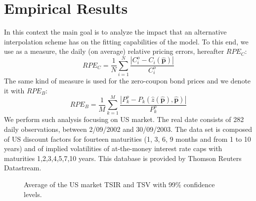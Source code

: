 \section{Empirical Results}
%
In this context the main goal is to analyze the impact that an 
alternative interpolation
scheme has on the fitting capabilities of the model. To this end, we use as a
measure, the daily (on average) relative pricing errors,
hereafter $RPE_C$:
$$
RPE_C=\frac{1}{N} \sum_{i=1}^N \frac{|C^o_i-C_i(\boldsymbol{\hat p})|}{C^o_i}
$$
 The same kind of measure is used for the zero-coupon bond prices and we denote it with
$RPE_B$: 
$$
RPE_B=\frac{1}{M} \sum_{k=1}^M \frac{|P^o_k-P_k(\hat z(\boldsymbol{\hat
    p}),\boldsymbol{\hat p})|}{P^o_k} 
$$
We perform such analysis focusing on US market. The real date consists
of 282 daily observations, between 2/09/2002 and 30/09/2003. The
data set is composed of US discount factors for fourteen maturities
(1, 3, 6, 9 months and from 1 to 10 years) and of implied volatilities
of at-the-money interest rate caps with maturities 1,2,3,4,5,7,10
years. This database is provided by Thomson Reuters Datastream.


\begin{figure}[h!]
\centering
\caption{Average of the US market TSIR and TSV with 99\% confidence levels.\label{Market}} 

\begin{minipage}[c]{12cm}
\end{minipage}

\begin{minipage}[c]{12cm}
\end{minipage}

\end{figure}

